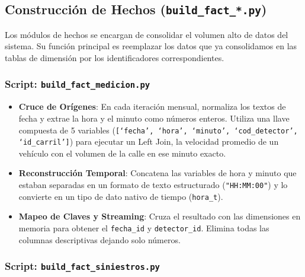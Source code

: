\subsection{Construcción de Hechos (\texttt{build\_fact\_*.py})}

Los módulos de hechos se encargan de consolidar el volumen alto de datos del
sistema. Su función principal es reemplazar los datos que ya consolidamos en 
las tablas de dimensi\'on por los identificadores correspondientes.

\subsubsection*{Script: \texttt{build\_fact\_medicion.py}}
\begin{itemize}[noitemsep]
    \item \textbf{Cruce de Orígenes}:
        En cada iteración mensual, normaliza los textos de fecha y extrae la
        hora y el minuto como números enteros. Utiliza una llave compuesta de 5
        variables (\texttt{[`fecha', `hora', `minuto', `cod\_detector', `id\_carril']}) 
        para ejecutar un Left Join, la velocidad promedio de un vehículo con
        el volumen de la calle en ese minuto exacto.
    \item \textbf{Reconstrucción Temporal}:
        Concatena las variables de hora y minuto que estaban separadas en un
        formato de texto estructurado (\texttt{"HH:MM:00"}) y lo convierte en
        un tipo de dato nativo de tiempo (\texttt{hora\_t}).
    \item \textbf{Mapeo de Claves y Streaming}:
        Cruza el resultado con las dimensiones en memoria para obtener
        el \texttt{fecha\_id} y \texttt{detector\_id}. Elimina todas las 
        columnas descriptivas dejando solo números. 
\end{itemize}

\subsubsection*{Script: \texttt{build\_fact\_siniestros.py}}

